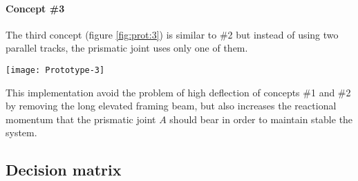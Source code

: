 	\paragraph{Concept \#3}	The third concept (figure \ref{fig:prot:3}) is similar to \#2 but instead of using two parallel tracks, the prismatic joint uses only one of them.

	\begin{SCfigure}[1.5][bht]
		\centering \texttt{[image: Prototype-3]}
		\caption{concept \#3  realised with a combination of both prismatic and revolute joint.}
		\label{fig:prot:3}
	\end{SCfigure}

	This implementation avoid the problem of high deflection of concepts \#1 and \#2 by removing the long elevated framing beam, but also increases the reactional momentum that the prismatic joint $A$ should bear in order to maintain stable the system.
	
	
\subsection{Decision matrix}

	
	
	
	
	

	
	
	
	
	
	
	
	
	
	
	
	
	
	
	
	
	
	
	
	
	
	
	
	
	
	
	
	
	
	
	
	
	
	
	
	
	
	
	
	
	
	
	
	
	
	